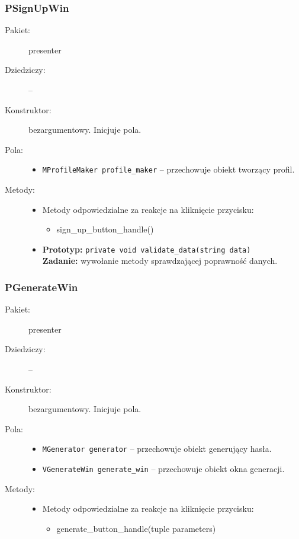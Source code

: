 \documentclass[a4paper]{article}
\newcommand{\prog}{\texttt}
\begin{document}
\subsubsection{PSignUpWin}
\begin{description}
    \item[Pakiet:] presenter
    \item[Dziedziczy:] --
    \item[Konstruktor:] bezargumentowy. Inicjuje pola.
    \item[Pola:] \hfill
    \begin{itemize}
        \item \prog{MProfileMaker profile\_maker} -- przechowuje obiekt tworzący profil.
    \end{itemize}
    \item[Metody:] \hfill
    \begin{itemize}
        \item Metody odpowiedzialne za reakcje na kliknięcie przycisku:
        \begin{itemize}
            \item sign\_up\_button\_handle()
        \end{itemize}
        \item \textbf{Prototyp:} \prog{private void validate\_data(string data)}\\\textbf{Zadanie:} wywołanie metody sprawdzającej poprawność danych.
    \end{itemize}
\end{description}

\subsubsection{PGenerateWin}
\begin{description}
    \item[Pakiet:] presenter
    \item[Dziedziczy:] --
    \item[Konstruktor:] bezargumentowy. Inicjuje pola.
    \item[Pola:] \hfill
    \begin{itemize}
        \item \prog{MGenerator generator} -- przechowuje obiekt generujący hasła.
        \item \prog{VGenerateWin generate\_win} -- przechowuje obiekt okna generacji.
    \end{itemize}
    \item[Metody:] \hfill
    \begin{itemize}
        \item Metody odpowiedzialne za reakcje na kliknięcie przycisku:
        \begin{itemize}
            \item generate\_button\_handle(tuple parameters)
        \end{itemize}
    \end{itemize}
\end{description}
\end{document}
